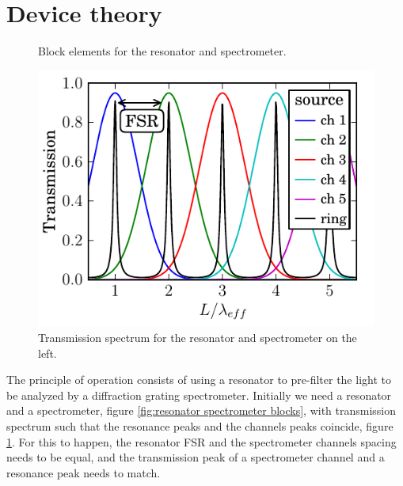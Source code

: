 \documentclass[12pt,twoside,english]{book}
\renewcommand{\~}{\perispomeni}%
\numberwithin{equation}{section}
\numberwithin{figure}{section}
\begin{document}
\section{Device theory}
\begin{figure}[h]
	\begin{minipage}[t]{0.49\columnwidth}%
	
	\caption{Block elements for the resonator and spectrometer.}
	\label{fig:resonator spectrometer blocks}
	\end{minipage}\hfill%
	\begin{minipage}[t]{0.49\columnwidth}%
	\includegraphics{ring-enhaced-sep}
	\caption{Transmission spectrum for the resonator and spectrometer on the left.}
	\label{fig:spectrum resonator spectrometer}
	\end{minipage}
\end{figure}
The principle of operation consists of using a resonator to pre-filter the light to be analyzed by a diffraction grating spectrometer. Initially we need a resonator and a spectrometer, figure \ref{fig:resonator spectrometer blocks}, with transmission spectrum such that the resonance peaks and the channels peaks coincide, figure \ref{fig:spectrum resonator spectrometer}. For this to happen, the resonator FSR and the spectrometer channels spacing needs to be equal, and the transmission peak of a spectrometer channel and a resonance peak needs to match.
\end{document}
